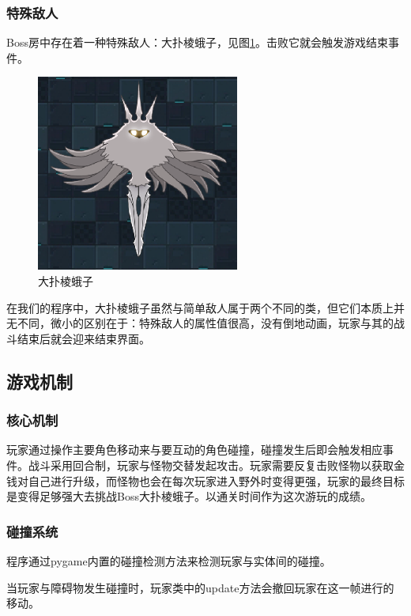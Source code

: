 \documentclass{ctexart}
\begin{document}
\subsubsection{特殊敌人}
Boss房中存在着一种特殊敌人：大扑棱蛾子，见图\ref{fig:大扑棱蛾子}。击败它就会触发游戏结束事件。
\begin{figure}[h]
\centering
\includegraphics[width=0.7\linewidth]{大扑棱蛾子.png}
\caption{\label{fig:大扑棱蛾子}大扑棱蛾子}
\end{figure}

在我们的程序中，大扑棱蛾子虽然与简单敌人属于两个不同的类，但它们本质上并无不同，微小的区别在于：特殊敌人的属性值很高，没有倒地动画，玩家与其的战斗结束后就会迎来结束界面。

\subsection{游戏机制}
\subsubsection{核心机制}
玩家通过操作主要角色移动来与要互动的角色碰撞，碰撞发生后即会触发相应事件。战斗采用回合制，玩家与怪物交替发起攻击。玩家需要反复击败怪物以获取金钱对自己进行升级，而怪物也会在每次玩家进入野外时变得更强，玩家的最终目标是变得足够强大去挑战Boss大扑棱蛾子。以通关时间作为这次游玩的成绩。

\subsubsection{碰撞系统}
程序通过pygame内置的碰撞检测方法来检测玩家与实体间的碰撞。

当玩家与障碍物发生碰撞时，玩家类中的update方法会撤回玩家在这一帧进行的移动。
\end{document}
